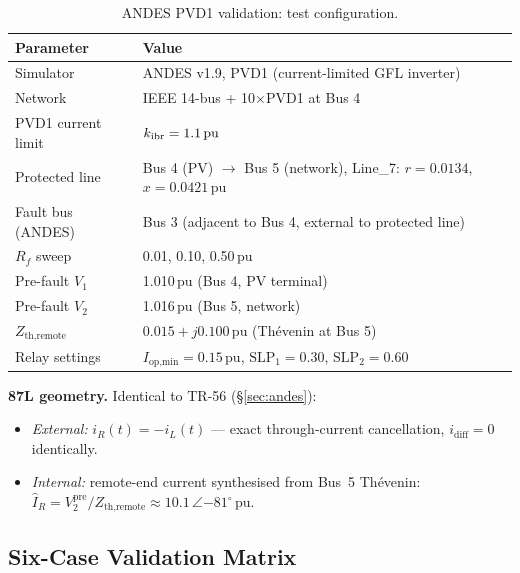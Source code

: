 \documentclass[11pt, a4paper]{article}
\newcommand{\kIBR}{k_{\rm ibr}}
\begin{document}
\begin{table}[!t]
  \centering
  \caption{ANDES PVD1 validation: test configuration.}
  \label{tab:andes_config}
  \begin{tabular}{ll}
    \toprule
    Parameter & Value \\
    \midrule
    Simulator       & ANDES v1.9, PVD1 (current-limited GFL inverter) \\
    Network         & IEEE 14-bus + 10$\times$PVD1 at Bus 4 \\
    PVD1 current limit & $\kIBR = 1.1\,\text{pu}$ \\
    Protected line  & Bus 4 (PV) $\to$ Bus 5 (network), Line\_7:
                      $r=0.0134$, $x=0.0421\,\text{pu}$ \\
    Fault bus (ANDES) & Bus 3 (adjacent to Bus 4, external to protected line) \\
    $R_f$ sweep     & 0.01, 0.10, 0.50\,pu \\
    Pre-fault $V_1$ & 1.010\,pu (Bus 4, PV terminal) \\
    Pre-fault $V_2$ & 1.016\,pu (Bus 5, network) \\
    $Z_\text{th,remote}$ & $0.015 + j0.100\,\text{pu}$ (Th\'evenin at Bus 5) \\
    Relay settings  & $I_\text{op,min}=0.15\,\text{pu}$, $\text{SLP}_1=0.30$,
                      $\text{SLP}_2=0.60$ \\
    \bottomrule
  \end{tabular}
\end{table}

\noindent\textbf{87L geometry.}
Identical to TR-56 (§\ref{sec:andes}):
\begin{itemize}
  \item \emph{External:} $i_R(t) = -i_L(t)$ — exact through-current
        cancellation, $i_\text{diff} = 0$ identically.
  \item \emph{Internal:} remote-end current synthesised from Bus~5 Th\'evenin:
        $\hat{I}_R = V_2^\text{pre}/Z_\text{th,remote}
        \approx 10.1\,\angle{-81^\circ}\,\text{pu}$.
\end{itemize}

\subsection{Six-Case Validation Matrix}
\end{document}
